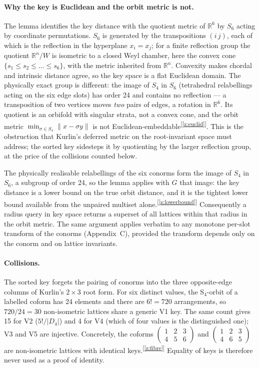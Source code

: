 \documentclass[11pt]{article}
\newcommand{\chk}[1]{\textsuperscript{[\ref{#1}]}}
\begin{document}
\paragraph{Why the key is Euclidean and the orbit metric is not.}
The lemma identifies the key distance with the quotient metric of $\mathbb R^6$ by $S_6$ acting by coordinate permutations. $S_6$ is generated by the transpositions $(i\,j)$, each of which is the reflection in the hyperplane $x_i=x_j$; for a finite reflection group the quotient $\mathbb R^n/W$ is isometric to a closed Weyl chamber, here the convex cone $\{s_1\le s_2\le\dots\le s_6\}$, with the metric inherited from $\mathbb R^n$. Convexity makes chordal and intrinsic distance agree, so the key space is a flat Euclidean domain. The physically exact group is different: the image of $S_4$ in $S_6$ (tetrahedral relabellings acting on the six edge slots) has order 24 and contains no reflection --- a transposition of two vertices moves \emph{two} pairs of edges, a rotation in $\mathbb R^6$. Its quotient is an orbifold with singular strata, not a convex cone, and the orbit metric $\min_{\sigma\in S_4}\|x-\sigma y\|$ is not Euclidean-embeddable\chk{z:euclid}. This is the obstruction that Kurlin's deferred metric on the root-invariant space must address; the sorted key sidesteps it by quotienting by the larger reflection group, at the price of the collisions counted below.

The physically realisable relabellings of the six conorms form the image of $S_4$ in $S_6$, a subgroup of order 24, so the lemma applies with $G$ that image: the key distance is a lower bound on the true orbit distance, and it is the tightest lower bound available from the unpaired multiset alone.\chk{z:lowerbound} Consequently a radius query in key space returns a superset of all lattices within that radius in the orbit metric. The same argument applies verbatim to any monotone per-slot transform of the conorms (Appendix~C), provided the transform depends only on the conorm and on lattice invariants.

\paragraph{Collisions.}
The sorted key forgets the pairing of conorms into the three opposite-edge columns of Kurlin's $2\times3$ root form. For six distinct values, the S$_4$-orbit of a labelled coform has 24 elements and there are $6!=720$ arrangements, so $720/24=30$ non-isometric lattices share a generic V1 key. The same count gives 15 for V2 ($5!/|D_4|$) and 4 for V4 (which of four values is the distinguished one); V3 and V5 are injective. Concretely, the coforms $\begin{pmatrix}1&2&3\\4&5&6\end{pmatrix}$ and $\begin{pmatrix}1&2&3\\4&6&5\end{pmatrix}$ are non-isometric lattices with identical keys.\chk{z:fibre} Equality of keys is therefore never used as a proof of identity.
\end{document}
